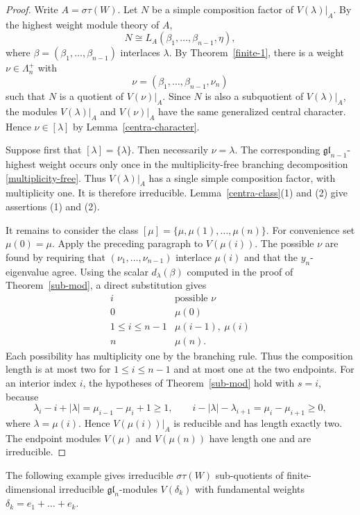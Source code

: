 \documentclass[12pt,a4paper]{amsart}
\numberwithin{equation}{section}
\def\gl{\mathfrak{gl}}
\def\l{\lambda}
\begin{document}
\begin{proof} Write $A=\sigma\tau(W)$. Let $N$ be a simple composition factor of
$V(\l)|_A$. By the highest weight module theory of $A$,
\[
 N\cong L_A(\beta_1,\dots,\beta_{n-1},\eta),
\]
where $\beta=(\beta_1,\dots,\beta_{n-1})$ interlaces $\l$. By
Theorem~\ref{finite-1}, there is a weight $\nu\in\Lambda_n^+$ with
\[
 \nu=(\beta_1,\dots,\beta_{n-1},\nu_n)
\]
such that $N$ is
a quotient of $V(\nu)|_A$. Since $N$ is also a subquotient of $V(\l)|_A$,
the  modules $V(\l)|_A$ and $V(\nu)|_A$ have the same generalized central character. Hence
$\nu\in[\l]$ by Lemma~\ref{centra-character}.

Suppose first that $[\l]=\{\l\}$. Then necessarily $\nu=\l$. The
corresponding $\gl_{n-1}$-highest weight occurs only once in the
multiplicity-free branching decomposition \eqref{multiplicity-free}. Thus
$V(\l)|_A$ has a single simple composition factor, with multiplicity one.
It is therefore irreducible. Lemma~\ref{centra-class}(1) and (2) give
assertions (1) and (2).

It remains to consider the class
$[\mu]=\{\mu,\mu(1),\dots,\mu(n)\}$. For convenience set
$\mu(0)=\mu$. Apply the preceding paragraph to $V(\mu(i))$. The possible
$\nu$ are found by requiring that
$(\nu_1,\dots,\nu_{n-1})$ interlace $\mu(i)$ and that the $y_n$-eigenvalue
agree. Using the scalar $d_\lambda(\beta)$ computed in the proof of
Theorem~\ref{sub-mod}, a direct substitution gives
\[
 \begin{array}{c|c}
 i & \text{possible }\nu\\ \hline
 0 & \mu(0)\\
 1\leq i\leq n-1 & \mu(i-1),\ \mu(i)\\
 n & \mu(n).
 \end{array}
\]
Each possibility has multiplicity one by the branching rule. Thus the
composition length is at most two for $1\leq i\leq n-1$ and at most one
at the two endpoints. For an interior index $i$, the hypotheses of
Theorem~\ref{sub-mod} hold with $s=i$, because
\[
 \lambda_i-i+|\lambda|=\mu_{i-1}-\mu_i+1\geq1,
 \qquad
 i-|\lambda|-\lambda_{i+1}=\mu_i-\mu_{i+1}\geq0,
\]
where $\lambda=\mu(i)$. Hence $V(\mu(i))|_A$ is reducible and has length
exactly two. The endpoint modules $V(\mu)$  and $V(\mu(n))$ have length one and are irreducible.
\end{proof}


The following example gives irreducible $\sigma\tau(W)$ sub-quotients of finite-dimensional irreducible $\gl_n$-modules $V(\delta_{k})$  with fundamental weights $\delta_k=e_1+\dots+e_k$.
\end{document}
